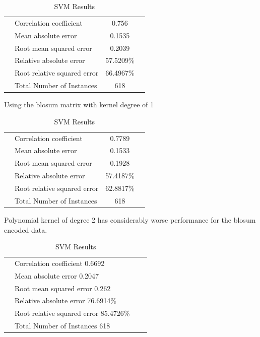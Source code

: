 \begin{table}[ht]
\begin{center}
\begin{tabular}{ ll c r }
\hline
 & Correlation coefficient &                 0.756 \\
 & Mean absolute error      &                0.1535 \\
 & Root mean squared error   &               0.2039 \\
 & Relative absolute error   &              57.5209\% \\
 & Root relative squared error &            66.4967\% \\
 & Total Number of Instances    &          618 \\
\hline
\end{tabular}
\label{fig:svm2}
\caption{SVM Results}

\end{center}
\end{table}

Using the blosum matrix with kernel degree of 1

\begin{table}[ht]
\begin{center}
\begin{tabular}{ ll c r }
\hline
 & Correlation coefficient  &                0.7789 \\
 & Mean absolute error       &               0.1533 \\
 & Root mean squared error   &               0.1928 \\
 & Relative absolute error   &              57.4187\% \\
 & Root relative squared error  &           62.8817\% \\
 & Total Number of Instances     &         618  \\
\hline
\end{tabular}
\label{fig:svm3}
\caption{SVM Results}
\end{center}
\end{table}

Polynomial kernel of degree 2 has considerably worse performance for the blosum encoded data.

\begin{table}[ht]
\begin{center}
\begin{tabular}{ ll c r }
\hline
 & Correlation coefficient                  0.6692 \\
 & Mean absolute error                      0.2047 \\
 & Root mean squared error                  0.262 \\
 & Relative absolute error                 76.6914\% \\
 & Root relative squared error             85.4726\% \\
 & Total Number of Instances              618  \\
\hline
\end{tabular}
\label{fig:svm4}
\caption{SVM Results}
\end{center}
\end{table}


